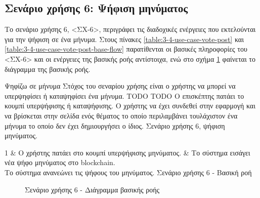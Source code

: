 \subsection{Σενάριο χρήσης 6: Ψήφιση μηνύματος} \label{subsection:3-4-use-case-vote-post}

Το σενάριο χρήσης 6, <ΣΧ-6>, περιγράφει τις διαδοχικές ενέργειες που εκτελούνται για την ψήφιση σε ένα μήνυμα. Στους πίνακες \ref{table:3-4-use-case-vote-post} και \ref{table:3-4-use-case-vote-post-base-flow} παρατίθενται οι βασικές πληροφορίες του <ΣΧ-6> και οι ενέργειες της βασικής ροής αντίστοιχα, ενώ στο σχήμα \ref{figure:3-4-use-case-vote-post-base-flow-sequence-diagram} φαίνεται το διάγραμμα της βασικής ροής.

\useCaseTable
{Ψηφίζω σε μήνυμα}
{Στόχος του σεναρίου χρήσης είναι ο χρήστης να μπορεί να υπερψηφίσει ή καταψηφίσει ένα μήνυμα.}
{TODO}
{TODO}
{Ο επισκέπτης πατάει το κουμπί υπερψήφισης ή καταψήφισης.}
{Ο χρήστης να έχει συνδεθεί στην εφαρμογή και να βρίσκεται στην σελίδα ενός θέματος το οποίο περιλαμβάνει τουλάχιστον ένα μήνυμα το οποίο δεν έχει δημιουργήσει ο ίδιος.}
{Σενάριο χρήσης 6, ψήφιση μηνύματος.}
{\label{table:3-4-use-case-vote-post}}


\useCaseBaseFlowTable
{
    1 & Ο χρήστης πατάει στο κουμπί υπερψήφισης μηνύματος. & Το σύστημα εισάγει νέα ψήφο μηνύματος στο blockchain. \\ [0.5ex]
}
{Το σύστημα ανανεώνει τις ψήφους του μηνύματος.}
{Σενάριο χρήσης 6 - Βασική ροή}
{\label{table:3-4-use-case-vote-post-base-flow}}

\begin{figure}[H]
    \centering
    
    \caption{Σενάριο χρήσης 6 - Διάγραμμα βασικής ροής}
    \label{figure:3-4-use-case-vote-post-base-flow-sequence-diagram}
\end{figure}
